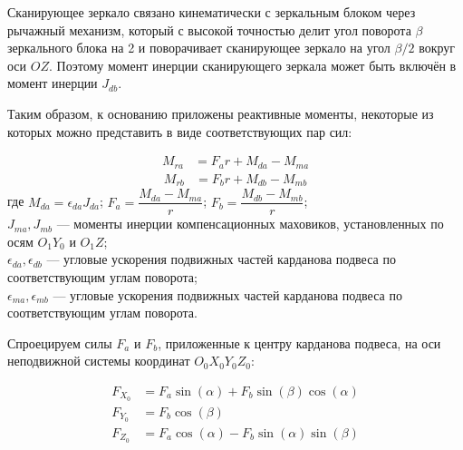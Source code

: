 Сканирующее зеркало связано кинематически с зеркальным блоком через рычажный механизм, который с высокой точностью делит угол поворота $\beta$ зеркального блока на 2 и поворачивает сканирующее зеркало на угол $\beta/2$ вокруг оси $OZ$. Поэтому момент инерции сканирующего зеркала может быть включён в момент инерции $J_{db}$.

Таким образом, к основанию приложены реактивные моменты, некоторые из которых можно представить в виде соответствующих пар сил:\\

\begin{samepage}
	\begin{equation}
		\label{eq:eq_Mra}
		\begin{alignedat}{2}
			M_{ra} &= F_a r + M_{da} - M_{ma}
		\end{alignedat}
	\end{equation}
	\begin{equation}
		\label{eq:eq_Mrb}
		\begin{alignedat}{2}
			M_{rb} &= F_b r + M_{db} - M_{mb}
		\end{alignedat}
	\end{equation}
	 где $M_{da} = \epsilon_{da}J_{da}$; \quad
	$F_a = \dfrac{M_{da}-M_{ma}}{r}$; \quad
	$F_b = \dfrac{M_{db}-M_{mb}}{r}$; \\
	$J_{ma}, J_{mb}$ — моменты инерции компенсационных маховиков, установленных по осям $O_1Y_0$ и $O_1Z$; \\
	$\epsilon_{da}, \epsilon_{db}$ — угловые ускорения подвижных частей карданова подвеса по соответствующим углам поворота; \\
	$\epsilon_{ma}, \epsilon_{mb}$ — угловые ускорения подвижных частей карданова подвеса по соответствующим углам поворота.
\end{samepage}

Спроецируем силы $F_a$ и $F_b$, приложенные к центру карданова подвеса, на оси неподвижной системы координат $O_0X_0Y_0Z_0$:
\begin{samepage}
	\begin{equation}
		\label{eq:eq_F0_proect}
		\begin{aligned}
			F_{X_0} &= F_a\sin(\alpha)+F_b\sin(\beta)\cos(\alpha) \\
			F_{Y_0} &=F_b\cos(\beta) \\
			F_{Z_0} &= F_a\cos(\alpha)-F_b\sin(\alpha)\sin(\beta)
		\end{aligned}	
	\end{equation}
\end{samepage}

